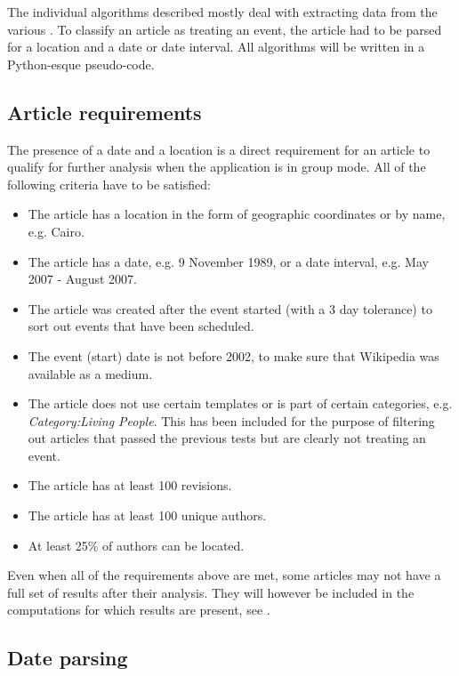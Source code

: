 The individual algorithms described mostly deal with extracting data from the various .
To classify an article as treating an event, the article had to be parsed for a location and a date or date interval.
All algorithms will be written in a Python-esque pseudo-code.

\subsection{Article requirements}\label{sub:articlerequirements}

The presence of a date and a location is a direct requirement for an article to qualify for further analysis when the application is in group mode.
All of the following criteria have to be satisfied:

\begin{itemize}
  \item The article has a location in the form of geographic coordinates or by name, e.g. Cairo.
  \item The article has a date, e.g. 9 November 1989, or a date interval, e.g. May 2007 - August 2007.
  \item The article was created after the event started (with a 3 day tolerance) to sort out events that have been scheduled.
  \item The event (start) date is not before 2002, to make sure that Wikipedia was available as a medium. 
  \item The article does not use certain templates or is part of certain categories, e.g. \emph{Category:Living People}.
  This has been included for the purpose of filtering out articles that passed the previous tests but are clearly not treating an event. 
  \item The article has at least 100 revisions.
  \item The article has at least 100 unique authors.
  \item At least 25\% of authors can be located.
\end{itemize}

Even when all of the requirements above are met, some articles may not have a full set of results after their analysis.
They will however be included in the computations for which results are present, see .

\subsection{Date parsing}

